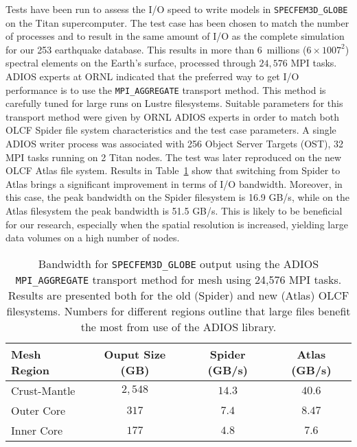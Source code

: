 Tests have been run to assess the I/O speed to write models in
\texttt{SPECFEM3D\_GLOBE} on the Titan supercomputer. The test case has been
chosen to match the number of processes and to result in the same amount of I/O
as the complete simulation for our 253 earthquake database. This results in more
than 6~millions ($6 \times 1007^2$) spectral elements on the Earth's surface,
processed through $24,576$ MPI tasks. ADIOS experts at ORNL indicated that the
preferred way to get I/O performance is to use the \texttt{MPI\_AGGREGATE}
transport method. This method is carefully tuned for large runs on Lustre
filesystems. Suitable parameters for this transport method were given by ORNL
ADIOS experts in order to match both OLCF Spider file system characteristics and
the test case parameters. A single ADIOS writer process was associated with 256
Object Server Targets (OST), 32 MPI tasks running on 2 Titan nodes. The test was
later reproduced on the new OLCF Atlas file system. Results in
Table~\ref{table:adios_perfs} show that switching from Spider to Atlas brings a
significant improvement in terms of I/O bandwidth. Moreover, in this case, the
peak bandwidth on the Spider filesystem is 16.9 GB/s, while on the Atlas
filesystem the peak bandwidth is 51.5 GB/s. This is likely to be beneficial for
our research, especially when the spatial resolution is increased, yielding
large data volumes on a high number of nodes.


\begin{table}%
  \caption[Benchmarks of I/O Bandwidth for ADIOS]
  {\small{Bandwidth for \texttt{SPECFEM3D\_GLOBE} output using the ADIOS
    \texttt{MPI\_AGGREGATE} transport method for mesh using 24,576 MPI tasks.
    Results are presented both for the old (Spider) and new (Atlas) OLCF
    filesystems. Numbers for different regions outline that large files benefit the
    most from use of the ADIOS library.}}
\begin{tabular}{@{}lccc@{}}
Mesh Region    &Ouput Size (GB) &Spider (GB/s) &Atlas (GB/s)\\[-2pt]
\midrule
Crust-Mantle     & $2, 548$             & $14.3$             & $40.6$               \\
Outer Core        & $317$                & $7.4$               & $8.47$               \\
Inner Core        & $177$                 & $4.8$              & $7.6$              \\
\end{tabular}
\label{table:adios_perfs}
\end{table}
